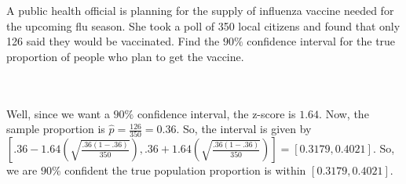 A public health official is planning for the supply of influenza vaccine needed for the upcoming flu
season. She took a poll of 350 local citizens and found that only 126 said they would be vaccinated.
Find the $90\%$ confidence interval for the true proportion of people who plan to get the vaccine.\\\\

\begin{solution}\renewcommand{\qedsymbol}{}\ \\
    Well, since we want a $90\%$ confidence interval, the z-score is $1.64$. Now, the sample proportion
    is $\hat{p}=\frac{126}{350}=0.36$. So, the interval is given by
    $[.36-1.64(\sqrt{\frac{.36(1-.36)}{350}}),.36+1.64(\sqrt{\frac{.36(1-.36)}{350}})]=[0.3179,0.4021]$.
    So, we are $90\%$ confident the true population proportion is within $[0.3179, 0.4021]$.

\end{solution}